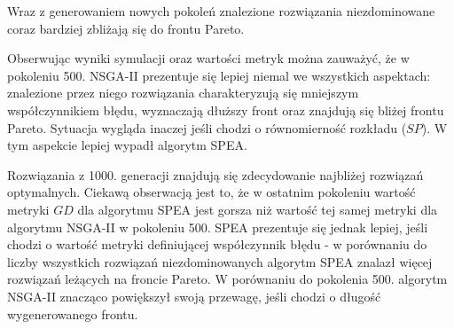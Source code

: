 \documentclass[twoside]{iisthesis}
\begin{document}
Wraz z generowaniem nowych pokoleń znalezione rozwiązania niezdominowane coraz bardziej zbliżają się do frontu Pareto.

Obserwując wyniki symulacji oraz wartości metryk można zauważyć, że w pokoleniu 500. NSGA-II prezentuje się lepiej niemal we wszystkich aspektach: znalezione przez niego rozwiązania charakteryzują się mniejszym współczynnikiem błędu, wyznaczają dłuższy front oraz znajdują się bliżej frontu Pareto. Sytuacja wygląda inaczej jeśli chodzi o równomierność rozkładu ($SP$). W tym aspekcie lepiej wypadł algorytm SPEA.

Rozwiązania z 1000. generacji znajdują się zdecydowanie najbliżej rozwiązań optymalnych. Ciekawą obserwacją jest to, że w ostatnim pokoleniu wartość metryki $GD$ dla algorytmu SPEA jest gorsza niż wartość tej samej metryki dla algorytmu NSGA-II w pokoleniu 500. SPEA prezentuje się jednak lepiej, jeśli chodzi o wartość metryki definiującej współczynnik błędu - w porównaniu do liczby wszystkich rozwiązań niezdominowanych algorytm SPEA znalazł więcej rozwiązań leżących na froncie Pareto. W porównaniu do pokolenia 500. algorytm NSGA-II znacząco powiększył swoją przewagę, jeśli chodzi o długość wygenerowanego frontu.\newpage
\end{document}

